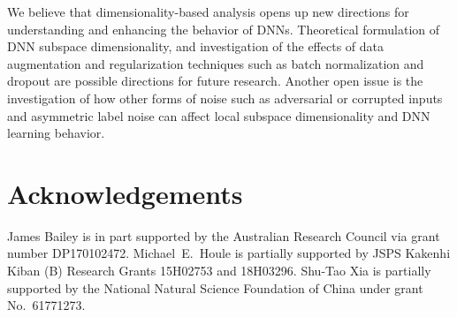 \documentclass{article}
\begin{document}
We believe that dimensionality-based analysis opens up new directions for understanding and enhancing the behavior of DNNs.
Theoretical formulation of DNN subspace dimensionality, and investigation of the effects of data augmentation and regularization techniques such as batch normalization \cite{ioffe2015batch} and dropout \cite{srivastava2014dropout} are possible directions for future research.  
Another open issue is the investigation of how other forms of noise such as adversarial or corrupted inputs and asymmetric label noise
can affect local subspace dimensionality and DNN learning behavior.






\section*{Acknowledgements}
James Bailey is in part supported by the Australian Research Council via grant number DP170102472. Michael~E.~Houle is partially supported by JSPS Kakenhi Kiban (B) Research Grants 15H02753 and 18H03296. Shu-Tao Xia is partially supported by the National Natural Science Foundation of China under grant No.~61771273.


\end{document}
